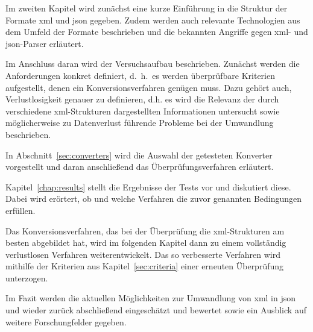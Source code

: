 Im zweiten Kapitel wird zunächst eine kurze Einführung in die Struktur der Formate \acrshort{xml} und \acrshort{json} gegeben. Zudem werden auch relevante Technologien aus dem Umfeld der Formate beschrieben und die bekannten Angriffe gegen \acrshort{xml}- und \acrshort{json}-Parser erläutert.

Im Anschluss daran wird der Versuchsaufbau beschrieben. Zunächst werden die Anforderungen konkret definiert, d.~h.\ es werden
überprüfbare Kriterien aufgestellt, denen ein Konversionsverfahren genügen
muss. Dazu gehört auch, Verlustlosigkeit genauer zu definieren, d.h.
es wird die Relevanz der durch verschiedene \acrshort{xml}-Strukturen dargestellten
Informationen untersucht sowie möglicherweise zu Datenverlust führende
Probleme bei der Umwandlung beschrieben.

In Abschnitt~\ref{sec:converters} wird die Auswahl der getesteten Konverter vorgestellt und daran anschließend das Überprüfungsverfahren erläutert.

Kapitel~\ref{chap:results} stellt die Ergebnisse der Tests vor und diskutiert diese.
Dabei wird erörtert, ob und welche Verfahren die zuvor genannten Bedingungen
erfüllen.

Das Konversionsverfahren, das bei der Überprüfung die \acrshort{xml}-Strukturen am besten abgebildet hat, wird im folgenden Kapitel dann zu einem vollständig verlustlosen Verfahren weiterentwickelt. Das so verbesserte Verfahren wird mithilfe der Kriterien aus Kapitel~\ref{sec:criteria} einer erneuten Überprüfung unterzogen.

Im Fazit werden die aktuellen Möglichkeiten zur Umwandlung
von \acrshort{xml} in \acrshort{json} und wieder zurück abschließend eingeschätzt und bewertet sowie ein Ausblick auf weitere Forschungfelder gegeben.

